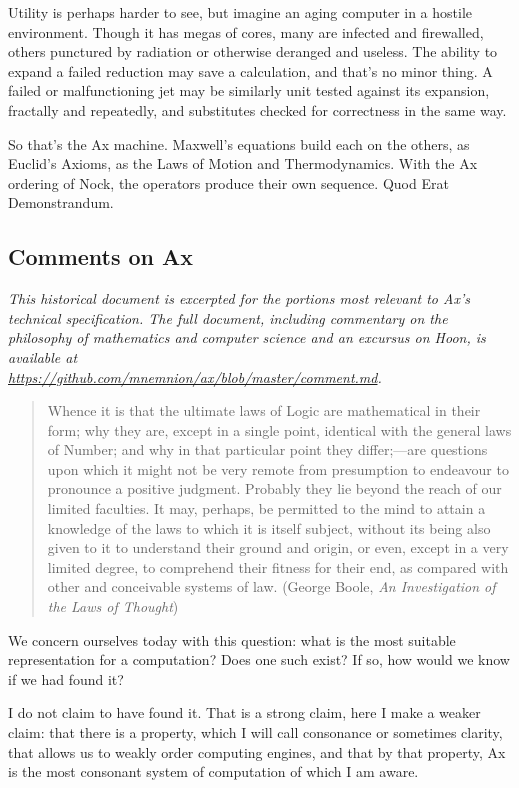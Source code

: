 \documentclass[twoside]{article}
\begin{document}
Utility is perhaps harder to see, but imagine an aging computer in a hostile environment. Though it has megas of cores, many are infected and firewalled, others punctured by radiation or otherwise deranged and useless. The ability to expand a failed reduction may save a calculation, and that's no minor thing. A failed or malfunctioning jet may be similarly unit tested against its expansion, fractally and repeatedly, and substitutes checked for correctness in the same way. 

So that's the Ax machine. Maxwell's equations build each on the others, as Euclid's Axioms, as the Laws of Motion and Thermodynamics. With the Ax ordering of Nock, the operators produce their own sequence. Quod Erat Demonstrandum.

\subsection{Comments on Ax}

\sloppy
\emph{This historical document is excerpted for the portions most \mbox{relevant} to Ax's technical specification. The full document, \mbox{including} commentary on the philosophy of mathematics and computer science and an excursus on Hoon, is available at \\ \url{https://github.com/mnemnion/ax/blob/master/comment.md}.}

\begin{quote}
  Whence it is that the ultimate laws of Logic are mathematical in their form; why they are, except in a single point, identical with the general laws of Number; and why in that particular point they differ;---are questions upon which it might not be very remote from presumption to endeavour to pronounce a positive judgment.  Probably they lie beyond the reach of our limited faculties.  It may, perhaps, be permitted to the mind to attain a knowledge of the laws to which it is itself subject, without its being also given to it to understand their ground and origin, or even, except in a very limited degree, to comprehend their fitness for their end, as compared with other and conceivable systems of law.  (George Boole, \emph{An Investigation of the Laws of Thought})
\end{quote}

We concern ourselves today with this question: what is the most suitable representation for a computation? Does one such exist? If so, how would we know if we had found it?

I do not claim to have found it. That is a strong claim, here I make a weaker claim: that there is a property, which I will call consonance or sometimes clarity, that allows us to weakly order computing engines, and that by that property, Ax is the most consonant system of computation of which I am aware.
\end{document}
